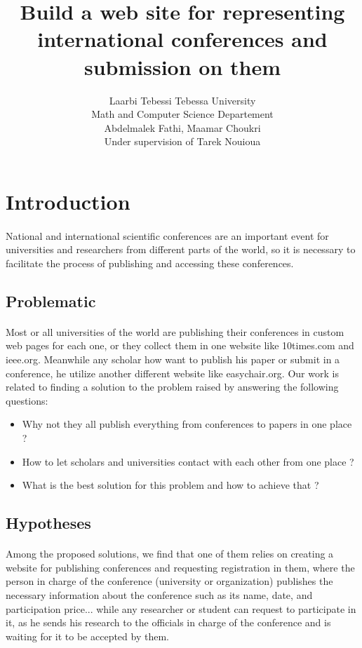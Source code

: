 \documentclass[12pt,a4paper]{article}
\author{
Laarbi Tebessi Tebessa University\\
Math and Computer Science Departement\\
Abdelmalek Fathi, Maamar Choukri\\
Under supervision of Tarek Nouioua}
\title{Build a web site for representing international conferences and submission on them}
\date{}
\begin{document}
	\maketitle
	\clearpage
	\listoffigures
	\listoftables
	\clearpage
	\tableofcontents
	\clearpage
	
	\section{Introduction}
	\paragraph{}
	National and international scientific conferences are an important event for universities and researchers from different parts of the world, so it is necessary to facilitate the process of publishing and accessing these conferences.
	\subsection{Problematic}
	\paragraph{}
	Most or all universities of the world are publishing their conferences in custom web pages for each one, or they collect them in one website like 10times.com and ieee.org. Meanwhile any scholar how want to publish his paper or submit in a conference, he utilize another different website like easychair.org. Our work is related to finding a solution to the problem raised by answering the following questions:
	\begin{itemize}
		\item Why not they all publish everything from conferences to papers in one place ?
		\item How to let scholars and universities contact with each other from one place ?
		\item What is the best solution for this problem and how to achieve that ?
	\end{itemize}
	\subsection{Hypotheses}
	\paragraph{}
	Among the proposed solutions, we find that one of them relies on creating a website for publishing conferences and requesting registration in them, where the person in charge of the conference (university or organization) publishes the necessary information about the conference such as its name, date, and participation price... while any researcher or student can request to participate in it, as he sends his research to the officials in charge of the conference and is waiting for it to be accepted by them.
\end{document}
